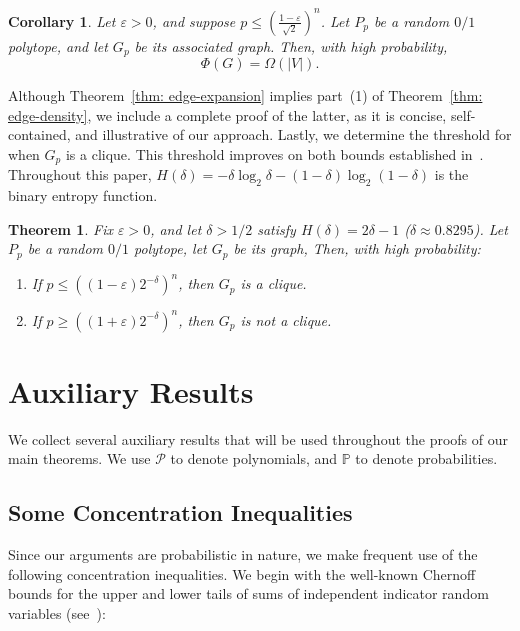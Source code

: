 \documentclass[11pt]{article}
\newcommand{\ep}{\varepsilon}
\theoremstyle{definition}
\theoremstyle{plain}
\newtheorem{thm}[definition]{Theorem}
\newtheorem{cor}[definition]{Corollary}
\begin{document}
\begin{cor}
    Let \( \varepsilon > 0 \), and suppose \( p \leq \left(\frac{1 - \varepsilon}{\sqrt{2}}\right)^n \). Let \( P_p \) be a random $0/1$ polytope, and let \( G_p \) be its associated graph. Then, with high probability, 
    \[ \Phi(G) = \Omega(|V|).\]
\end{cor}

Although Theorem~\ref{thm: edge-expansion}  implies part~(1) of Theorem~\ref{thm: edge-density}, we include a complete proof of the latter, as it is concise, self-contained, and illustrative of our approach. Lastly, we determine the threshold for when $G_p$ is a clique. This threshold improves on both bounds established in~\cite{BondarenkoBrodskiiCliques}.
Throughout this paper, \( H(\delta) = -\delta \log_2 \delta - (1-\delta) \log_2 (1-\delta) \) is the binary entropy function.


\begin{thm} \label{thm: clique threshold}
Fix $\varepsilon > 0$, and let $\delta>1/2$ satisfy $H(\delta)=2\delta -1$ ($\delta\approx 0.8295$).
Let $P_p$ be a random $0/1$ polytope, let $G_p$ be its graph, Then, with high probability:
\begin{enumerate}
    \item If $p \leq \left( (1 - \varepsilon) 2^{-\delta} \right)^n$, then $G_p$ is a clique.
    
    \item If $p \geq \left((1+\ep)2^{-\delta}\right)^n$, then $G_p$ is not a clique.
\end{enumerate}
\end{thm}


\section{Auxiliary Results}

We collect several auxiliary results that will be used throughout the proofs of our main theorems. We use \( \mathcal{P} \) to denote polynomials, and \( \mathbb{P} \) to denote probabilities.


\subsection{Some Concentration Inequalities}

Since our arguments are probabilistic in nature, we make frequent use of the following concentration inequalities.
We begin with the well-known Chernoff bounds for the upper and lower tails of sums of independent indicator random variables (see~\cite{JLR}):
\end{document}
